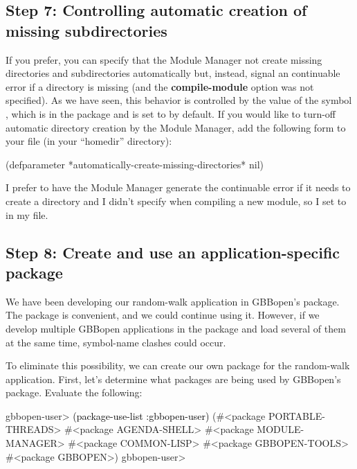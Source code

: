\documentclass[10pt,twoside,english,pdftex]{article}
\begin{document}
\subsection*{Step 7: Controlling automatic creation of missing subdirectories}

%
If you prefer, you can specify that the Module Manager not create missing
 directories and subdirectories
automatically but, instead, signal an continuable error if a directory is
missing (and the  \textbf{compile-module} option was
not specified).  As we have seen, this behavior is controlled by the value of
the symbol , which
is in the  package and is set to  by
default.  If you would like to turn-off automatic directory creation by the
Module Manager, add the following form to your 
file (in your ``homedir'' directory):
%
\W\supp
\begin{example}
  (defparameter *automatically-create-missing-directories* nil)
\end{example}

I prefer to have the Module Manager generate the continuable error if it needs
to create a  directory and I didn't
specify  when compiling a new module, so I set
 to  in my
 file.

\subsection*{Step 8: Create and use an application-specific package}

We have been developing our random-walk application in GBBopen's
 package.  The  package
is convenient, and we could continue using it.  However, if we develop
multiple GBBopen applications in the  package and
load several of them at the same time, symbol-name clashes could occur.

To eliminate this possibility, we can create our own package for the
random-walk application.  First, let's determine what packages are being used
by GBBopen's  package.  Evaluate the following:
%
\W\supp
\begin{example}
\textcolor{darkergray}{%
  gbbopen-user> \textcolor{black}{(package-use-list :gbbopen-user)}
  (#<package PORTABLE-THREADS> #<package AGENDA-SHELL>
   #<package MODULE-MANAGER> #<package COMMON-LISP>
   #<package GBBOPEN-TOOLS> #<package GBBOPEN>)
  gbbopen-user>}
\end{example}
\end{document}
